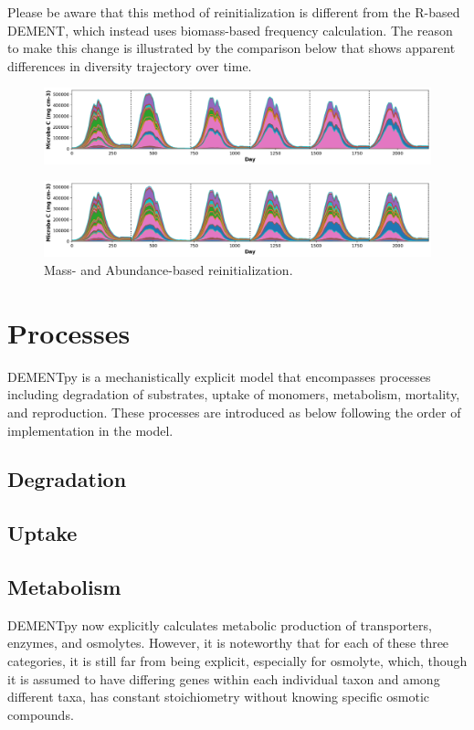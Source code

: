 \documentclass[12pt, oneside, titlepage]{article}      %
\begin{document}
Please be aware that this method of reinitialization is different from the R-based DEMENT, which instead uses biomass-based frequency calculation. The reason to make this change is illustrated by the comparison below that shows apparent differences in diversity trajectory over time.

\begin{figure}[H]
  \centering
  \includegraphics[width=\linewidth]{figures/Fig_Mass_based_reinitialization.png}
  \label{fig:reinitialization}
\end{figure}

\begin{figure}[H]
  \centering
  \includegraphics[width=\linewidth]{figures/Fig_Abundance_based_reinitialization.png}
  \caption{Mass- and Abundance-based reinitialization.}
  \label{fig:reinitialization}
\end{figure}




\section{Processes}
DEMENTpy is a mechanistically explicit model that encompasses processes including degradation of substrates, uptake of monomers, metabolism, mortality, and reproduction. These processes are introduced as below following the order of implementation in the model.
\subsection{Degradation}

\subsection{Uptake}

\subsection{Metabolism}
DEMENTpy now explicitly calculates metabolic production of transporters, enzymes, and osmolytes. However, it is noteworthy that for each of these three categories, it is still far from being explicit, especially for osmolyte, which, though it is assumed to have differing genes within each individual taxon and among different taxa, has constant stoichiometry without knowing specific osmotic compounds.
\end{document}
